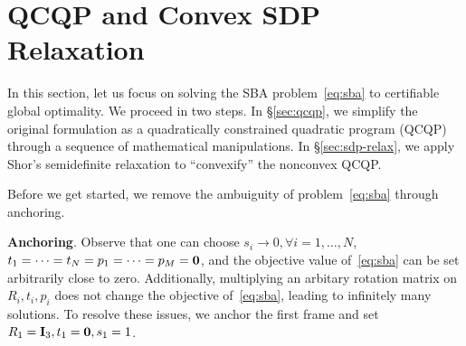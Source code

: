 \section{QCQP and Convex SDP Relaxation}
\label{sec:method}

In this section, let us focus on solving the SBA problem~\eqref{eq:sba} to certifiable global optimality. We proceed in two steps. In \S\ref{sec:qcqp}, we simplify the original formulation as a quadratically constrained quadratic program (QCQP) through a sequence of mathematical manipulations. In \S\ref{sec:sdp-relax}, we apply Shor's semidefinite relaxation to ``convexify'' the nonconvex QCQP. 

Before we get started, we remove the ambuiguity of problem~\eqref{eq:sba} through anchoring.


{\bf Anchoring}. Observe that one can choose $s_i \rightarrow 0, \forall i = 1, \dots, N$, $t_1 = \dots = t_N = p_1 = \dots = p_M = {\bf 0}$, and the objective value of~\eqref{eq:sba} can be set arbitrarily close to zero. Additionally, multiplying an arbitary rotation matrix on $R_i, t_i, p_i$ does not change the objective of~\eqref{eq:sba}, leading to infinitely many solutions. To resolve these issues, we anchor the first frame and set $R_1 = {\mathbf I}_3, t_1 = {\mathbf 0}, s_1 = 1$.


